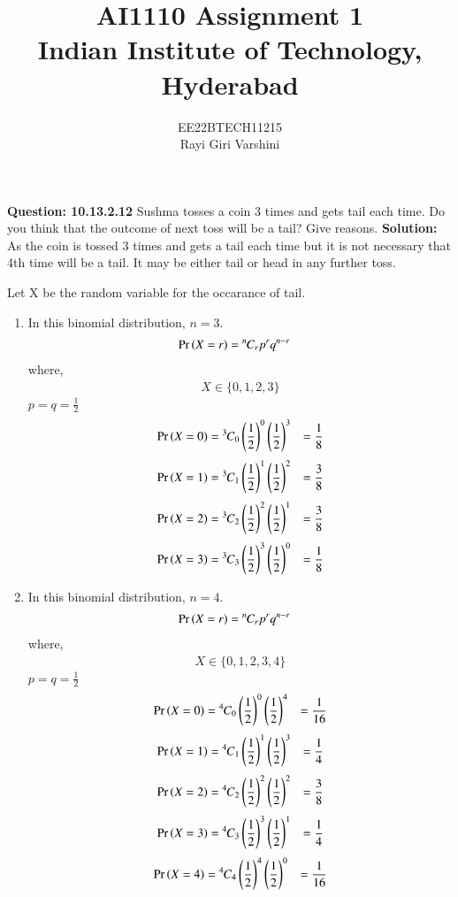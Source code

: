 \documentclass[journal,12pt,twocolumn]{IEEEtran}
\title{
AI1110 Assignment 1\\
  \Large Indian Institute of Technology, Hyderabad
}
\author{
  EE22BTECH11215\\[4pt]
  Rayi Giri Varshini\\  
}
\providecommand{\pr}[1]{\ensuremath{\Pr\left(#1\right)}}
\providecommand{\brak}[1]{\ensuremath{\left(#1\right)}}
\theoremstyle{remark}
\newcommand{\permcomb}[4][0mu]{{{}^{#3}\mkern#1#2_{#4}}}
\newcommand{\comb}[1][-1mu]{\permcomb[#1]{C}}
\begin{document}
%
\maketitle
\textbf{Question: 10.13.2.12} 
Sushma tosses a coin 3 times and gets tail each time. Do you think that the outcome of next toss will be a tail? Give reasons.
\textbf{Solution: }As the coin is tossed 3 times and gets a tail each time but it is not necessary that 4th time will be a tail. It may be either tail or head in any further toss.

Let X be the random variable for the occarance of tail.
\begin{enumerate}[label=(\roman*)]
\item In this binomial distribution, $n = 3$.
\begin{align} \pr{X=r} &= \comb{n}{r} p^{r}q^{n-r} \end{align} where, \begin{align} X\in{\{0, 1, 2, 3\}} 
\end{align}
  $p = q = \frac{1}{2}$ 
\begin{align} \pr{X=0} &= \comb{3}{0}  \brak{\frac{1}{2}}^{0} \brak{\frac{1}{2}}^{3} &= \frac{1}{8} \end{align}
\begin{align} \pr{X=1} &= \comb{3}{1}  \brak{\frac{1}{2}}^{1} \brak{\frac{1}{2}}^{2} &= \frac{3}{8} \end{align}
\begin{align} \pr{X=2} &= \comb{3}{2}  \brak{\frac{1}{2}}^{2} \brak{\frac{1}{2}}^{1} &= \frac{3}{8} \end{align}
\begin{align} \pr{X=3} &= \comb{3}{3}  \brak{\frac{1}{2}}^{3} \brak{\frac{1}{2}}^{0} &= \frac{1}{8} \end{align}
\item In this binomial distribution, $n = 4$.
\begin{align} \pr{X=r} &= \comb{n}{r} p^{r}q^{n-r} \end{align} where, \begin{align} X\in{\{0, 1, 2, 3, 4\}}
\end{align}
  $p = q = \frac{1}{2}$
\begin{align} \pr{X=0} &= \comb{4}{0}  \brak{\frac{1}{2}}^{0} \brak{\frac{1}{2}}^{4} &= \frac{1}{16} \end{align}
\begin{align} \pr{X=1} &= \comb{4}{1}  \brak{\frac{1}{2}}^{1} \brak{\frac{1}{2}}^{3} &= \frac{1}{4} \end{align}
\begin{align} \pr{X=2} &= \comb{4}{2}  \brak{\frac{1}{2}}^{2} \brak{\frac{1}{2}}^{2} &= \frac{3}{8} \end{align}
\begin{align} \pr{X=3} &= \comb{4}{3}  \brak{\frac{1}{2}}^{3} \brak{\frac{1}{2}}^{1} &= \frac{1}{4} \end{align}
\begin{align} \pr{X=4} &= \comb{4}{4}  \brak{\frac{1}{2}}^{4} \brak{\frac{1}{2}}^{0} &= \frac{1}{16} \end{align}
\end{enumerate}
\end{document}
